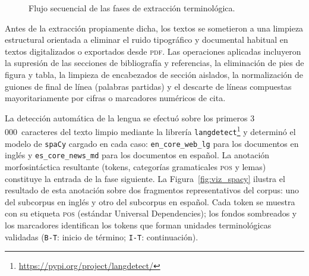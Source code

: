 \begin{figure}[ht]
    
    \caption{Flujo secuencial de las fases de extracción terminológica.}
    \label{fig:diagrama_extraccion}
\end{figure}

Antes de la extracción propiamente dicha, los textos se sometieron a una
limpieza estructural orientada a eliminar el ruido tipográfico y documental
habitual en textos digitalizados o exportados desde \textsc{pdf}. Las
operaciones aplicadas incluyeron la supresión de las secciones de bibliografía
y referencias, la eliminación de pies de figura y tabla, la limpieza de
encabezados de sección aislados, la normalización de guiones de final de línea
(palabras partidas) y el descarte de líneas compuestas mayoritariamente por
cifras o marcadores numéricos de cita.

La detección automática de la lengua se efectuó sobre los primeros
3\,000~caracteres del texto limpio mediante la librería
\texttt{langdetect}\footnote{\url{https://pypi.org/project/langdetect/}} y
determinó el modelo de \texttt{spaCy} cargado en cada caso:
\texttt{en\_core\_web\_lg} para los documentos en inglés y
\texttt{es\_core\_news\_md} para los documentos en español. La anotación
morfosintáctica resultante (tokens, categorías gramaticales \textsc{pos} y
lemas) constituye la entrada de la fase siguiente. La Figura~\ref{fig:viz_spacy} ilustra el
resultado de esta anotación sobre dos fragmentos representativos del corpus: uno del
subcorpus en inglés y otro del subcorpus en español. Cada token se muestra con su
etiqueta \textsc{pos} (estándar Universal Dependencies); los fondos sombreados y los
marcadores identifican los tokens que forman unidades terminológicas validadas
(\texttt{B-T}: inicio de término; \texttt{I-T}: continuación).

